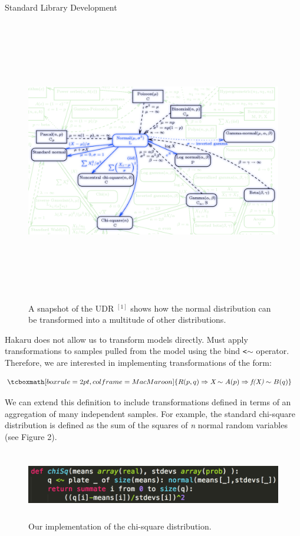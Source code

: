 \documentclass[22pt]{beamer}
\begin{document}
\begin{frame}[fragile]
\begin{textblock}{5}
\begin{textblock}{5}
\begin{block}{\Large{Standard Library Development}}
\bigskip

\begin{figure}
\centering
\includegraphics[height=12.5cm]{UDR.png}
\caption{\tiny{A snapshot of the UDR $^{[1]}$ shows how the normal distribution can be transformed into a multitude of other distributions.}}
\end{figure}

\footnotesize{Hakaru does not allow us to transform models directly. Must apply transformations to samples pulled from the model using the bind {\tt \tiny{<$\sim$}} operator. Therefore, we are interested in implementing transformations of the form:}

\begin{equation*}
\begin{aligned}
& \tcboxmath[boxrule=2pt,colframe=MacMaroon]{R(p, q) \Rightarrow \textit{X} \sim A(p) \Rightarrow \textit{f(X)} \sim B(q)}
\end{aligned}
\end{equation*}

\bigskip

\footnotesize We can extend this definition to include transformations defined in terms of an aggregation of many independent samples. For example, the standard chi-square distribution is defined as the sum of the squares of \textit{n} normal random variables (see Figure 2). 

\bigskip
\begin{figure}
\centering
\includegraphics[height=3cm]{chi-square.png}
\caption{\tiny{Our implementation of the chi-square distribution.}}
\end{figure}


\end{block}
\end{textblock}
\end{textblock}
\end{frame}
\end{document}
